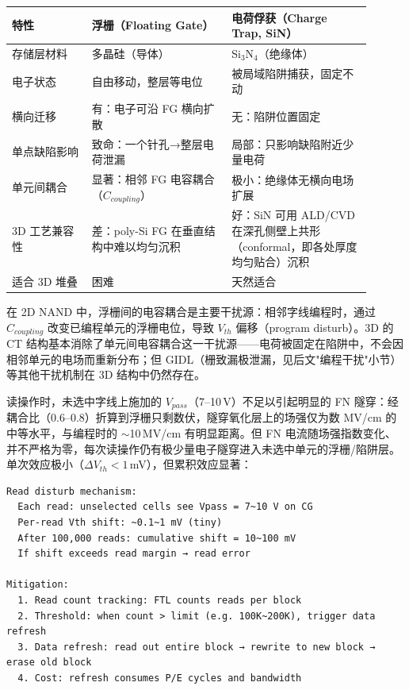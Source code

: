 \begin{longtable}{L{0.2\linewidth}L{0.35\linewidth}L{0.35\linewidth}}
\toprule
特性 & 浮栅（Floating Gate） & 电荷俘获（Charge Trap, SiN） \\
\midrule
存储层材料 & 多晶硅（导体） & Si$_3$N$_4$（绝缘体） \\
电子状态 & 自由移动，整层等电位 & 被局域陷阱捕获，固定不动 \\
横向迁移 & 有：电子可沿 FG 横向扩散 & 无：陷阱位置固定 \\
单点缺陷影响 & 致命：一个针孔→整层电荷泄漏 & 局部：只影响缺陷附近少量电荷 \\
单元间耦合 & 显著：相邻 FG 电容耦合（$C_{coupling}$） & 极小：绝缘体无横向电场扩展 \\
3D 工艺兼容性 & 差：poly-Si FG 在垂直结构中难以均匀沉积 & 好：SiN 可用 ALD/CVD 在深孔侧壁上共形（conformal，即各处厚度均匀贴合）沉积 \\
适合 3D 堆叠 & 困难 & 天然适合 \\
\bottomrule
\end{longtable}

在 2D NAND 中，浮栅间的电容耦合是主要干扰源：相邻字线编程时，通过 $C_{coupling}$ 改变已编程单元的浮栅电位，导致 $V_{th}$ 偏移（program disturb）。3D 的 CT 结构基本消除了单元间电容耦合这一干扰源——电荷被固定在陷阱中，不会因相邻单元的电场而重新分布；但 GIDL（栅致漏极泄漏，见后文"编程干扰"小节）等其他干扰机制在 3D 结构中仍然存在。


读操作时，未选中字线上施加的 $V_{pass}$（7--10\,V）不足以引起明显的 FN 隧穿：经耦合比（0.6--0.8）折算到浮栅只剩数伏，隧穿氧化层上的场强仅为数 MV/cm 的中等水平，与编程时的 $\sim$10\,MV/cm 有明显距离。但 FN 电流随场强指数变化、并不严格为零，每次读操作仍有极少量电子隧穿进入未选中单元的浮栅/陷阱层。单次效应极小（$\Delta V_{th} < 1$\,mV），但累积效应显著：

\begin{lstlisting}
Read disturb mechanism:
  Each read: unselected cells see Vpass = 7~10 V on CG
  Per-read Vth shift: ~0.1~1 mV (tiny)
  After 100,000 reads: cumulative shift = 10~100 mV
  If shift exceeds read margin → read error

Mitigation:
  1. Read count tracking: FTL counts reads per block
  2. Threshold: when count > limit (e.g. 100K~200K), trigger data refresh
  3. Data refresh: read out entire block → rewrite to new block → erase old block
  4. Cost: refresh consumes P/E cycles and bandwidth
\end{lstlisting}

